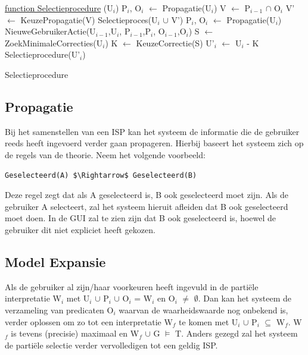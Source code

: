 \begin{algorithm}
	\underline{function Selectieprocedure} (U$_{i}$)\;
		{
		P$_{i}$, O$_{i}$ $\leftarrow$ Propagatie(U$_{i}$)\;
		V $\leftarrow$ P$_{i-1}$ $\cap$ O$_{i}$\;
			{
			V' $\leftarrow$ KeuzePropagatie(V)\; 
			Selectieproces(U$_{i}$ $\cup$ V')\;
			}
			{
			P$_{i}$, O$_{i}$ $\leftarrow$ Propagatie(U$_{i}$)\;	
			NieuweGebruikerActie(U$_{i-1}$,U$_{i}$,
			P$_{i-1}$,P$_{i}$,
			O$_{i-1}$,O$_{i}$)\;
			}
		}
		{
		S $\leftarrow$ ZoekMinimaleCorrecties(U$_{i}$)\; 
		K $\leftarrow$ KeuzeCorrectie(S)\; 
		U'$_{i}$ $\leftarrow$ U$_{i}$ - K\; 
		Selectieprocedure(U'$_{i}$)\;
		}
	\caption{Selectieprocedure\label{alg:selectieprocedure}}
\end{algorithm}

\subsection{Propagatie}
Bij het samenstellen van een ISP kan het systeem de informatie die de gebruiker reeds heeft ingevoerd verder gaan propageren. Hierbij baseert het systeem zich op de regels van de theorie. Neem het volgende voorbeeld: 
\begin{lstlisting}[mathescape]
Geselecteerd(A) $\Rightarrow$ Geselecteerd(B)
\end{lstlisting}
Deze regel zegt dat als A geselecteerd is, B ook geselecteerd moet zijn. Als de gebruiker A selecteert, zal het systeem hieruit afleiden dat B ook geselecteerd moet doen. In de GUI zal te zien zijn dat B ook geselecteerd is, hoewel de gebruiker dit niet expliciet heeft gekozen.

\subsection{Model Expansie}
Als de gebruiker al zijn/haar voorkeuren heeft ingevuld in de parti\"{e}le interpretatie W$_{i}$ met U$_{i}$ $\cup$ P$_{i}$ $\cup$ O$_{i}$ = W$_{i}$ en O$_{i}$ $\neq$ $\emptyset$. Dan kan het systeem de verzameling van predicaten O$_{i}$ waarvan de waarheidswaarde nog onbekend is, verder oplossen om zo tot een interpretatie W$_{f}$ te komen met U$_{i}$ $\cup$ P$_{i}$ $\subseteq$ W$_{f}$. W$_{f}$ is tevens (precisie) maximaal en W$_{f}$ $\cup$ G $\models$ T. Anders gezegd zal het systeem de parti\"{e}le selectie verder vervolledigen tot een geldig ISP. 

